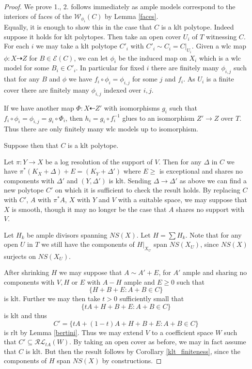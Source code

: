 \documentclass[a4paper,12pt]{amsart}
\begin{document}
	\begin{proof}
		We prove 1., 2. follows immediately as ample models correspond to the interiors of faces of the $\mathcal{W}_{\phi_{i}}(C)$ by Lemma \ref{faces}.\\	
		
		Equally, it is enough to show this in the case that $C$ is a klt polytope. Indeed suppose it holds for klt polytopes. Then take an open cover $U_{i}$ of $T$ witnessing $C$. For each $i$ we may take a klt polytope $C'_{i}$ with $C'_{i} \sim C_{i}=C|_{U_{i}}$. Given a wlc map $\phi:X \dashrightarrow Z$ for $B \in \mathcal{E}(C)$, we can let $\phi_{i}$ be the induced map on $X_{i}$ which is a wlc model for some $B_{i} \in C'_{i}$. In particular for fixed $i$ there are finitely many $\phi_{i,j}$ such that for any $B$ and $\phi$ we have $f_{i} \circ \phi_{i}=\phi_{i,j}$ for some $j$ and $f_{i}$. As $U_{i}$ is a finite cover there are finitely many $\phi_{i,j}$ indexed over $i,j$.
		
		If we have another map $\Phi:X \dashleftarrow Z'$ with isomorphisms $g_{i}$ such that $f_{i} \circ \phi_{i}=\phi_{i,j}= g_{i} \circ \Phi_{i}$, then $h_{i}=g_{i} \circ f^{-1}_{i}$ glues to an isomorphism $Z' \to Z$ over $T$. Thus there are only finitely many wlc models up to isomorphism.
		
		Suppose then that $C$ is a klt polytope.		
		
		Let $\pi:Y \to X$ be a log resolution of the support of $V$. Then for any $\Delta$ in $C$ we have $\pi^{*}(K_{X}+\Delta)+E=(K_{Y}+\Delta')$ where $E \geq $ is exceptional and shares no components with $\Delta'$ and $(Y,\Delta')$ is klt. Sending $\Delta \to \Delta'$ as above we can find a new polytope $C'$ on which it is sufficient to check the result holds. By replacing $C$ with $C'$, $A$ with $\pi^{*}A$, $X$ with $Y$ and $V$ with a suitable space, we may suppose that $X$ is smooth, though it may no longer be the case that $A$ shares no support with $V$. 
		
		Let $H_{k}$ be ample divisors spanning $NS(X)$. Let $H= \sum H_{k}$. Note that for any open $U$ in $T$ we still have the components of $H|_{X_{U}}$ span $NS(X_{U})$, since $NS(X)$ surjects on $NS(X_{U})$.
		
		After shrinking $H$ we may suppose that $A \sim A'+E$, for $A'$ ample and sharing no components with $V,H$ or $E$ with $A-H$ ample and $E \geq 0$ such that $$\{H+B+E \colon A+B \in C\}$$ is klt. Further we may then take $t >0$ sufficiently small that $$\{tA+H+B+E \colon A+B \in C\}$$ is klt and thus $$C'=\{tA+(1-t)A+H+B+E \colon A+B \in C\}$$ is rlt by Lemma \ref{bertini}. Thus we may extend $V$ to a coefficient space $W$ such that $C' \subseteq \mathcal{RL}_{tA}(W)$. By taking an open cover as before, we may in fact assume that $C$ is klt. But then the result follows by Corollary \ref{klt_finiteness}, since the components of $H$ span $NS(X)$ by constructions.	
		
	\end{proof}
	
\end{document}
